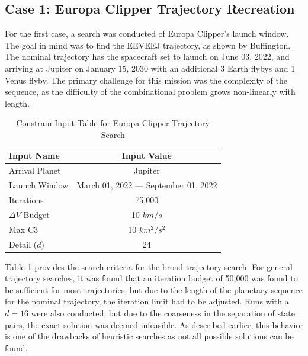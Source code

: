 \documentclass[letterpaper, preprint, paper,11pt]{AAS}	%
\begin{document}
\subsection{Case 1: Europa Clipper Trajectory Recreation}

For the first case, a search was conducted of Europa Clipper's launch window. The goal in mind was to find the EEVEEJ trajectory, as shown by Buffington\cite{Buffington2014}. The nominal trajectory has the spacecraft set to launch on June 03, 2022, and arriving at Jupiter on January 15, 2030 with an additional 3 Earth flybys and 1 Venus flyby. The primary challenge for this mission was the complexity of the sequence, as the difficulty of the combinational problem grows non-linearly with length.
\begin{table}[htb]
    \centering
    \caption{Constrain Input Table for Europa Clipper Trajectory Search}
    \label{table:clipInputs}
    \begin{tabular}{lc}
        \toprule
        \textbf{Input Name} & \textbf{Input Value}\\
        \midrule
        Arrival Planet & Jupiter \\
        Launch Window & March 01, 2022 --- September 01, 2022 \\
        Iterations & 75,000 \\ 
        $\Delta V$ Budget & 10 $km/s$ \\
        Max C3 & 10 $km^2/s^2$ \\
        Detail ($d$) & 24 \\
        \bottomrule
    \end{tabular}
\end{table}


Table \ref*{table:clipInputs} provides the search criteria for the broad trajectory search. For general trajectory searches, it was found that an iteration budget of 50,000 was found to be sufficient for most trajectories, but due to the length of the planetary sequence for the nominal trajectory, the iteration limit had to be adjusted. Runs with a $d = 16$ were also conducted, but due to the coarseness in the separation of state pairs, the exact solution was deemed infeasible. As described earlier, this behavior is one of the drawbacks of heuristic searches as not all possible solutions can be found. 
\end{document}
